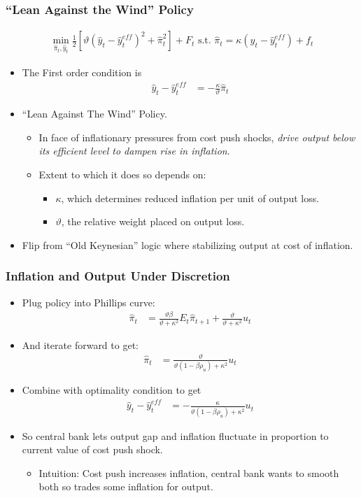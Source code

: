 \documentclass[english,xcolor=svgnames]{beamer}
\begin{document}
\begin{frame}
\frametitle{``Lean Against the Wind'' Policy}
\begin{align*}\min_{\hat{\pi}_t,\hat{y}_t}\frac{1}{2}[\vartheta (\hat{y}_{t} - \hat{y}_{t}^{eff})^2+\hat{\pi}_{t}^2]+F_t\text{ s.t. }\hat{\pi}_t=\kappa(\hat{y}_{t} - \hat{y}_{t}^{eff})+f_t
	\end{align*}
\begin{itemize}
	\item The First order condition is	\begin{align*}
		\hat{y}_{t} - \hat{y}_{t}^{eff} &=-\frac{\kappa}{\vartheta}\hat{\pi}_{t}
	\end{align*}
	\item  ``Lean Against The Wind'' Policy.
	\begin{itemize}
		\item In face of inflationary pressures from cost push shocks, \emph{drive output below its efficient level to dampen rise in inflation}.
		\item Extent to which it does so depends on:
		\begin{itemize}
			\item $\kappa$, which determines reduced inflation per unit of output loss.
			\item $\vartheta$, the relative weight placed on output loss.
		\end{itemize}
	\end{itemize}
	\item Flip from ``Old Keynesian'' logic where stabilizing output at cost of inflation.
\end{itemize}
\end{frame}


\begin{frame}
\frametitle{Inflation and Output Under Discretion}
\begin{itemize}
	\item Plug policy into Phillips curve:
	\begin{align*}
		\hat{\pi}_t &=\frac{\vartheta\beta}{\vartheta+\kappa^2}E_t\hat{\pi}_{t+1}+\frac{\vartheta}{\vartheta+\kappa^2}u_t
	\end{align*}
	\item  And iterate forward to get:
	\begin{align*}
		\hat{\pi}_t &=\frac{\vartheta}{\vartheta(1-\beta\rho_u)+\kappa^2}u_t
	\end{align*}
	\item Combine with optimality condition to get
	\begin{align*}
		\hat{y}_{t} - \hat{y}_{t}^{eff} &=-\frac{\kappa}{\vartheta(1-\beta\rho_u)+\kappa^2}u_t
	\end{align*}
	\item So central bank lets output gap and inflation fluctuate in proportion to current value of cost push shock.
	\begin{itemize}
		\item Intuition: Cost push increases inflation, central bank wants to smooth both so trades some inflation for output.
	\end{itemize}
\end{itemize}
\end{frame}
\end{document}
